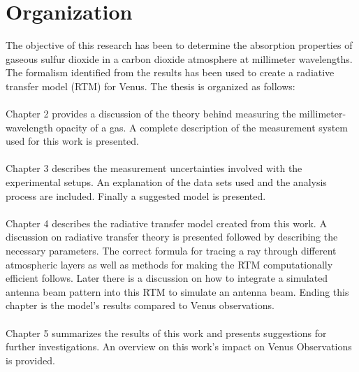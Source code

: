\section{Organization}
The objective of this research has been to determine the absorption properties of gaseous sulfur dioxide in a carbon dioxide atmosphere at millimeter wavelengths. The formalism identified from the results has been used to create a radiative transfer model (RTM) for Venus. The thesis is organized as follows:
\\ \\
\noindent Chapter 2 provides a discussion of the theory behind measuring the millimeter-wavelength opacity of a gas. A complete description of the measurement system used for this work is presented.
\\ \\
\noindent Chapter 3 describes the measurement uncertainties involved with the experimental setups. An explanation of the data sets used and the analysis process are included. Finally a suggested model is presented.
\\ \\
\noindent Chapter 4 describes the radiative transfer model created from this work. A discussion on radiative transfer theory is presented followed by describing the necessary parameters. The correct formula for tracing a ray through different atmospheric layers as well as methods for making the RTM computationally efficient follows. Later there is a discussion on how to integrate a simulated antenna beam pattern into this RTM to simulate an antenna beam. Ending this chapter is the model's results compared to Venus observations.
\\ \\
\noindent Chapter 5 summarizes the results of this work and presents suggestions for further investigations. An overview on this work's impact on Venus Observations is provided.

